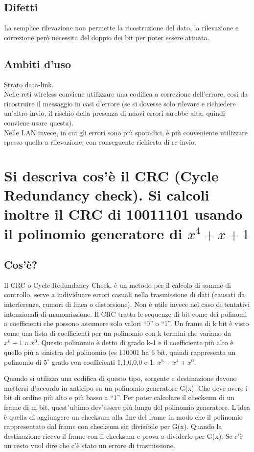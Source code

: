 \subsection{Difetti}
La semplice rilevazione non permette la ricostruzione del dato, la rilevazione e correzione però necessita del doppio dei bit per poter essere attuata.

\subsection{Ambiti d'uso}
Strato data-link.\\
Nelle reti wireless conviene utilizzare una codifica a correzione dell'errore, cosi da ricostruire il messaggio in casi d'errore
(se si dovesse solo rilevare e richiedere un'altro invio, il rischio della presenza di nuovi errori sarebbe alta, quindi conviene usare questa).\\
Nelle LAN invece, in cui gli errori sono più sporadici, è più conveniente utilizzare spesso quella a rilevazione, con conseguente richiesta di re-invio.

\section{Si descriva cos'è il CRC (Cycle Redundancy check). Si calcoli inoltre il CRC di 10011101 usando il polinomio generatore di $x^4+x+1$}

\subsection{Cos'è?}
Il CRC o Cycle Redundancy Check, è un metodo per il calcolo di somme di controllo, serve a individuare errori casuali nella trasmissione di dati
(causati da interferenze, rumori di linea o distorsione).
Non è utile invece nel caso di tentativi intenzionali di manomissione.
Il CRC tratta le sequenze di bit come dei polinomi a coefficienti che possono assumere solo valori “0” o “1”.
Un frame di k bit è visto come una lista di coefficienti per un polinomio con k termini che variano da $x^k-1$ a $x^0$.
Questo polinomio è detto di grado k-1 e il coefficiente più alto è quello più a sinistra del polinomio
(es 110001 ha 6 bit, quindi rappresenta un polinomio di $5^{\circ}$ grado con coefficienti 1,1,0,0,0 e 1: $x^5+x^4+x^0$.

Quando si utilizza una codifica di questo tipo, sorgente e destinazione devono mettersi d'accordo in anticipo su un polinomio generatore G(x).
Che deve avere i bit di ordine più alto e più basso a “1”.
Per poter calcolare il checksum di un frame di m bit, quest'ultimo dev'essere più lungo del polinomio generatore.
L'idea è quella di aggiungere un checksum alla fine del frame in modo che il polinomio rappresentato dal frame con checksum sia divisibile per G(x).
Quando la destinazione riceve il frame con il checksum e prova a dividerlo per G(x).
Se c'è un resto vuol dire che c'è stato un errore di trasmissione.
